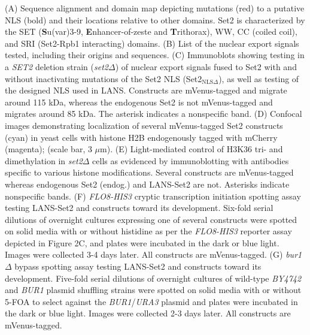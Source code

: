 \documentclass[11pt]{biorxiv}
\newcommand{\burdelt}{\emph{bur1$\Delta$}\xspace}
\newcommand{\setdelt}{\emph{set2$\Delta$}\xspace}
\begin{document}
\noindent (A) Sequence alignment and domain map depicting mutations (red) to a putative NLS (bold) and their locations relative to other domains. Set2 is characterized by the SET (\textbf{S}u(var)3-9, \textbf{E}nhancer-of-zeste and \textbf{T}rithorax), WW, CC (coiled coil), and SRI (Set2-Rpb1 interacting) domains. (B) List of the nuclear export signals tested, including their origins and sequences. (C) Immunoblots showing testing in a \emph{SET2} deletion strain (\setdelt) of nuclear export signals fused to Set2 with and without inactivating mutations of the Set2 NLS (Set2$_{\text{NLS}\Delta}$), as well as testing of the designed NLS used in LANS. Constructs are mVenus-tagged and migrate around 115 kDa, whereas the endogenous Set2 is not mVenus-tagged and migrates around 85 kDa. The asterisk indicates a nonspecific band. (D) Confocal images demonstrating localization of several mVenus-tagged Set2 constructs (cyan) in yeast cells with histone H2B endogenously tagged with mCherry (magenta); (scale bar, 3 $\mu$m). (E) Light-mediated control of H3K36 tri- and dimethylation in \setdelt cells as evidenced by immunoblotting with antibodies specific to various histone modifications. Several constructs are mVenus-tagged whereas endogenous Set2 (endog.) and LANS-Set2 are not. Asterisks indicate nonspecific bands. (F) \emph{FLO8-HIS3} cryptic transcription initiation spotting assay testing LANS-Set2 and constructs toward its development. Six-fold serial dilutions of overnight cultures expressing one of several constructs were spotted on solid media with or without histidine as per the \emph{FLO8-HIS3} reporter assay depicted in Figure 2C, and plates were incubated in the dark or blue light. Images were collected 3-4 days later. All constructs are mVenus-tagged. (G) \burdelt bypass spotting assay testing LANS-Set2 and constructs toward its development. Five-fold serial dilutions of overnight cultures of wild-type \emph{BY4742} and \emph{BUR1} plasmid shuffling strains were spotted on solid media with or without 5-FOA to select against the \emph{BUR1}/\emph{URA3} plasmid and plates were incubated in the dark or blue light. Images were collected 2-3 days later. All constructs are mVenus-tagged.

\clearpage
\end{document}

